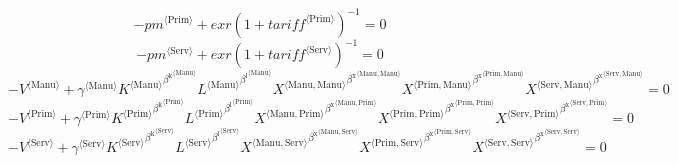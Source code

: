 \begin{equation}
-{{p\!m}}^{\langle \mathrm{Prim}\rangle} + {{e\!x\!r}} \left(1 + {{t\!a\!r\!i\!f\!f}}^{\langle \mathrm{\mathrm{Prim}}\rangle}\right)^{-1} = 0
\end{equation}
\begin{equation}
-{{p\!m}}^{\langle \mathrm{Serv}\rangle} + {{e\!x\!r}} \left(1 + {{t\!a\!r\!i\!f\!f}}^{\langle \mathrm{\mathrm{Serv}}\rangle}\right)^{-1} = 0
\end{equation}
\begin{equation}
-{V}^{\langle \mathrm{Manu}\rangle} + {{\gamma}^{\langle \mathrm{\mathrm{Manu}}\rangle}} {{{K}^{\langle \mathrm{Manu}\rangle}}^{{\beta^{\mathrm{k}}}^{\langle \mathrm{\mathrm{Manu}}\rangle}}} {{{L}^{\langle \mathrm{Manu}\rangle}}^{{\beta^{\mathrm{l}}}^{\langle \mathrm{\mathrm{Manu}}\rangle}}} {{{X}^{\langle \mathrm{Manu},\mathrm{Manu}\rangle}}^{{\beta^{\mathrm{x}}}^{\langle \mathrm{\mathrm{Manu}},\mathrm{\mathrm{Manu}}\rangle}}} {{{X}^{\langle \mathrm{Prim},\mathrm{Manu}\rangle}}^{{\beta^{\mathrm{x}}}^{\langle \mathrm{\mathrm{Prim}},\mathrm{\mathrm{Manu}}\rangle}}} {{{X}^{\langle \mathrm{Serv},\mathrm{Manu}\rangle}}^{{\beta^{\mathrm{x}}}^{\langle \mathrm{\mathrm{Serv}},\mathrm{\mathrm{Manu}}\rangle}}} = 0
\end{equation}
\begin{equation}
-{V}^{\langle \mathrm{Prim}\rangle} + {{\gamma}^{\langle \mathrm{\mathrm{Prim}}\rangle}} {{{K}^{\langle \mathrm{Prim}\rangle}}^{{\beta^{\mathrm{k}}}^{\langle \mathrm{\mathrm{Prim}}\rangle}}} {{{L}^{\langle \mathrm{Prim}\rangle}}^{{\beta^{\mathrm{l}}}^{\langle \mathrm{\mathrm{Prim}}\rangle}}} {{{X}^{\langle \mathrm{Manu},\mathrm{Prim}\rangle}}^{{\beta^{\mathrm{x}}}^{\langle \mathrm{\mathrm{Manu}},\mathrm{\mathrm{Prim}}\rangle}}} {{{X}^{\langle \mathrm{Prim},\mathrm{Prim}\rangle}}^{{\beta^{\mathrm{x}}}^{\langle \mathrm{\mathrm{Prim}},\mathrm{\mathrm{Prim}}\rangle}}} {{{X}^{\langle \mathrm{Serv},\mathrm{Prim}\rangle}}^{{\beta^{\mathrm{x}}}^{\langle \mathrm{\mathrm{Serv}},\mathrm{\mathrm{Prim}}\rangle}}} = 0
\end{equation}
\begin{equation}
-{V}^{\langle \mathrm{Serv}\rangle} + {{\gamma}^{\langle \mathrm{\mathrm{Serv}}\rangle}} {{{K}^{\langle \mathrm{Serv}\rangle}}^{{\beta^{\mathrm{k}}}^{\langle \mathrm{\mathrm{Serv}}\rangle}}} {{{L}^{\langle \mathrm{Serv}\rangle}}^{{\beta^{\mathrm{l}}}^{\langle \mathrm{\mathrm{Serv}}\rangle}}} {{{X}^{\langle \mathrm{Manu},\mathrm{Serv}\rangle}}^{{\beta^{\mathrm{x}}}^{\langle \mathrm{\mathrm{Manu}},\mathrm{\mathrm{Serv}}\rangle}}} {{{X}^{\langle \mathrm{Prim},\mathrm{Serv}\rangle}}^{{\beta^{\mathrm{x}}}^{\langle \mathrm{\mathrm{Prim}},\mathrm{\mathrm{Serv}}\rangle}}} {{{X}^{\langle \mathrm{Serv},\mathrm{Serv}\rangle}}^{{\beta^{\mathrm{x}}}^{\langle \mathrm{\mathrm{Serv}},\mathrm{\mathrm{Serv}}\rangle}}} = 0
\end{equation}

